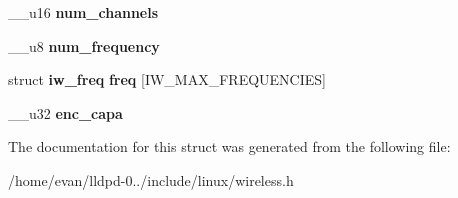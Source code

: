 \begin{DoxyCompactItemize}
\item 
\-\_\-\-\_\-u16 {\bfseries num\-\_\-channels}\label{structiw__range_a0c2fc29d2aa60546e532d28304d65c55}

\item 
\-\_\-\-\_\-u8 {\bfseries num\-\_\-frequency}\label{structiw__range_ad42190782df9904228298bee020de81a}

\item 
struct {\bf iw\-\_\-freq} {\bfseries freq} [\-I\-W\-\_\-\-M\-A\-X\-\_\-\-F\-R\-E\-Q\-U\-E\-N\-C\-I\-E\-S]\label{structiw__range_a856a28b0353c4c1cd3da45538d6ab160}

\item 
\-\_\-\-\_\-u32 {\bfseries enc\-\_\-capa}\label{structiw__range_aaf7e86eec663534316ae525c1c8a5b88}

\end{DoxyCompactItemize}


\-The documentation for this struct was generated from the following file\-:\begin{DoxyCompactItemize}
\item 
/home/evan/lldpd-\/0../include/linux/wireless.\-h\end{DoxyCompactItemize}
